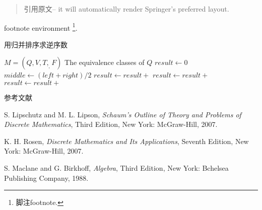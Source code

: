 \begin{quotation}
	引用原文-- it will automatically render Springer's preferred layout.
\end{quotation}

footnote environment \footnote{脚注footnote.}.

\begin{algorithm}  
	\caption{用归并排序求逆序数}  
	\begin{algorithmic}[1] %
		\Require $M=(Q,V,T,_,F)$  
		\Ensure The equivalence classes of $Q$  
		\State $result \gets 0$  
		\State $middle \gets (left + right) / 2$  
		\State $result \gets result +$   
		\State $result \gets result +$   
		\State $result \gets result +$   
		\EndIf  
		\State {}  
		\EndFunction 
	\end{algorithmic}   
\end{algorithm}

参考文献
%

\begin{thebibliography}{99}
	
	
	S. Lipschutz and M. L. Lipson, \textit{Schaum's Outline of Theory and Problems of Discrete Mathematics}, Third Edition, New York: McGraw-Hill, 2007.
	
	K. H. Rosen, \textit{Discrete Mathematics and Its Applications}, Seventh Edition, New York: McGraw-Hill, 2007.
	
	S. Maclane and G. Birkhoff, \textit{Algebra}, Third Edition, New York: Bchelsea Publishing Company, 1988.
\end{thebibliography}
